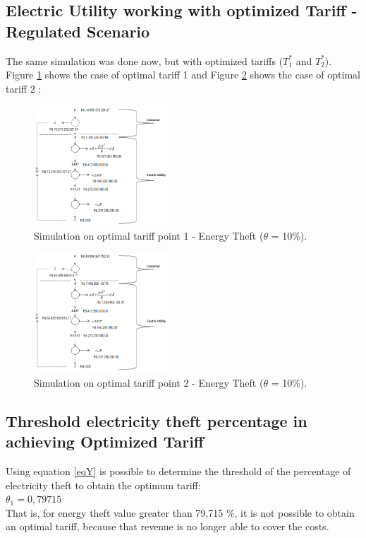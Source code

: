 \documentclass[preprint,12pt]{elsarticle}
\begin{document}
\subsection{Electric Utility working with optimized Tariff - Regulated Scenario}
\label{sec4-2}
The same simulation was done now, but with optimized tariffs ($T_1^* $ and $ T_2^*$). Figure \ref{Fig10} shows the case of optimal tariff 1 and Figure \ref{Fig11} shows the case of optimal tariff 2 :
\begin{figure}[h]%
\centering
\includegraphics[width = 0.45\textwidth]{Fig10.png} 
\caption{Simulation on optimal tariff point 1 - Energy Theft ($\theta$ = 10\%).}
\label{Fig10}
\end{figure}

\begin{figure}[h]%
\centering
\includegraphics[width = 0.45\textwidth]{fig11.png} 
\caption{Simulation on optimal tariff point 2 - Energy Theft ($\theta$ = 10\%).}
\label{Fig11}
\end{figure}

\subsection{Threshold electricity theft percentage in achieving Optimized Tariff}
\label{sec4-3}
Using equation \ref{eqY} is possible to determine the threshold of the percentage of electricity theft to obtain the optimum tariff: \\
$\theta_1 = 0,79715$\\
That is, for energy theft value greater than 79,715 \%, it is not possible to obtain an optimal tariff, because that revenue is no longer able to cover the costs. \\
\end{document}
